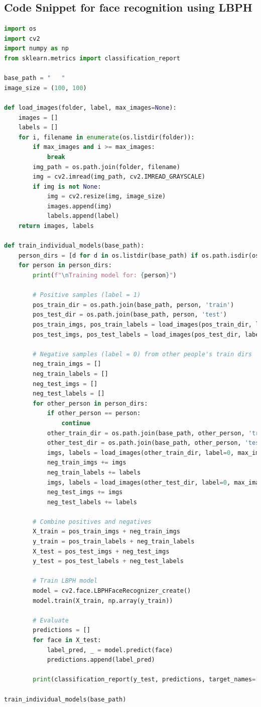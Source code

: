 \documentclass[openany]{report}
\begin{document}
\subsection{Code Snippet for face recognition using LBPH}
\begin{lstlisting}[language=Python]
import os
import cv2
import numpy as np
from sklearn.metrics import classification_report

base_path = "   "
image_size = (100, 100)

def load_images(folder, label, max_images=None):
    images = []
    labels = []
    for i, filename in enumerate(os.listdir(folder)):
        if max_images and i >= max_images:
            break
        img_path = os.path.join(folder, filename)
        img = cv2.imread(img_path, cv2.IMREAD_GRAYSCALE)
        if img is not None:
            img = cv2.resize(img, image_size)
            images.append(img)
            labels.append(label)
    return images, labels

def train_individual_models(base_path):
    person_dirs = [d for d in os.listdir(base_path) if os.path.isdir(os.path.join(base_path, d))]
    for person in person_dirs:
        print(f"\nTraining model for: {person}")
        
        # Positive samples (label = 1)
        pos_train_dir = os.path.join(base_path, person, 'train')
        pos_test_dir = os.path.join(base_path, person, 'test')
        pos_train_imgs, pos_train_labels = load_images(pos_train_dir, label=1)
        pos_test_imgs, pos_test_labels = load_images(pos_test_dir, label=1)

        # Negative samples (label = 0) from other people's train dirs
        neg_train_imgs = []
        neg_train_labels = []
        neg_test_imgs = []
        neg_test_labels = []
        for other_person in person_dirs:
            if other_person == person:
                continue
            other_train_dir = os.path.join(base_path, other_person, 'train')
            other_test_dir = os.path.join(base_path, other_person, 'test')
            imgs, labels = load_images(other_train_dir, label=0, max_images=len(pos_train_imgs)//(len(person_dirs)-1))
            neg_train_imgs += imgs
            neg_train_labels += labels
            imgs, labels = load_images(other_test_dir, label=0, max_images=len(pos_test_imgs)//(len(person_dirs)-1))
            neg_test_imgs += imgs
            neg_test_labels += labels

        # Combine positives and negatives
        X_train = pos_train_imgs + neg_train_imgs
        y_train = pos_train_labels + neg_train_labels
        X_test = pos_test_imgs + neg_test_imgs
        y_test = pos_test_labels + neg_test_labels

        # Train LBPH model
        model = cv2.face.LBPHFaceRecognizer_create()
        model.train(X_train, np.array(y_train))

        # Evaluate
        predictions = []
        for face in X_test:
            label_pred, _ = model.predict(face)
            predictions.append(label_pred)

        print(classification_report(y_test, predictions, target_names=["Other", person]))

train_individual_models(base_path)
\end{lstlisting}
\end{document}
